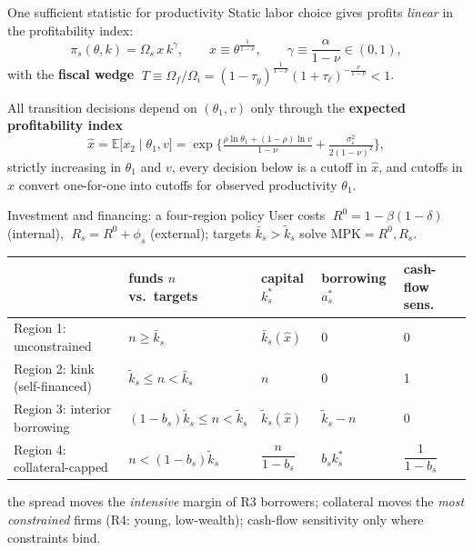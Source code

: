 \documentclass[11pt,aspectratio=169]{beamer}
\providecommand{\infml}{i}
\providecommand{\fml}{f}
\providecommand{\curv}{\gamma}
\providecommand{\prodx}{x}
\providecommand{\prodxhat}{\hat{x}}
\providecommand{\spread}[1]{\phi_{#1}}
\providecommand{\collat}[1]{b_{#1}}
\providecommand{\Rint}{R^{0}}
\providecommand{\Rext}[1]{R_{#1}}
\providecommand{\taxy}{\tau_{y}}
\providecommand{\taxl}{\tau_{\ell}}
\providecommand{\Om}[1]{\Omega_{#1}}
\providecommand{\netw}{n}
\providecommand{\E}{\mathbb{E}}
\begin{document}
\begin{frame}{One sufficient statistic for productivity}
Static labor choice gives profits \emph{linear} in the profitability
index:
\begin{equation*}
  \pi_{s}(\theta,k)=\Om{s}\,\prodx\,k^{\curv},\qquad
  \prodx\equiv\theta^{\frac{1}{1-\nu}},\qquad
  \curv\equiv\frac{\alpha}{1-\nu}\in(0,1),
\end{equation*}
with the \textbf{fiscal wedge}
$\;T\equiv\Om{\fml}/\Om{\infml}
=(1-\taxy)^{\frac{1}{1-\nu}}(1+\taxl)^{-\frac{\nu}{1-\nu}}<1$.
 
\bigskip
All transition decisions depend on $(\theta_{1},v)$ only through the
\textbf{expected profitability index}
\begin{equation*}
  \prodxhat=\E\big[\prodx_{2}\mid\theta_{1},v\big]
  =\exp\Big\{\tfrac{\rho\ln\theta_{1}+(1-\rho)\ln v}{1-\nu}
  +\tfrac{\sigma_{\varepsilon}^{2}}{2(1-\nu)^{2}}\Big\},
\end{equation*}
strictly increasing in $\theta_{1}$ and $v$, every decision below
is a cutoff in $\prodxhat$, and cutoffs in $\prodxhat$ convert
one-for-one into cutoffs for observed productivity $\theta_1$.
\end{frame}
 
\begin{frame}{Investment and financing: a four-region policy}
User costs $\;\Rint=1-\beta(1-\delta)$ (internal),
$\;\Rext{s}=\Rint+\spread{s}$ (external); targets
$\bar k_{s}>\tilde k_{s}$ solve $\mathrm{MPK}=\Rint,\Rext{s}$.
\begin{center}
\renewcommand{\arraystretch}{1.25}\small
\begin{tabular}{lllll}
\toprule
 & funds $\netw$ vs.\ targets & capital $k^{*}_{s}$ &
 borrowing $a^{*}_{s}$ & cash-flow sens.\ \\
\midrule
Region 1: unconstrained & $\netw\geq\bar k_{s}$ & $\bar k_{s}(\prodxhat)$
 & 0 & 0 \\
Region 2: kink (self-financed) & $\tilde k_{s}\leq\netw<\bar k_{s}$ &
 $\netw$ & 0 & 1 \\
Region 3: interior borrowing & $(1-\collat{s})\tilde k_{s}\leq\netw
 <\tilde k_{s}$ & $\tilde k_{s}(\prodxhat)$ & $\tilde k_{s}-\netw$
 & 0 \\
Region 4: collateral-capped & $\netw<(1-\collat{s})\tilde k_{s}$ &
 $\dfrac{\netw}{1-\collat{s}}$ & $\collat{s}k^{*}_{s}$ &
 $\dfrac{1}{1-\collat{s}}$ \\
\bottomrule
\end{tabular}
\end{center}
\medskip
{} the spread moves the \emph{intensive} margin of R3 borrowers; collateral moves the \emph{most constrained} firms (R4: young, low-wealth); cash-flow sensitivity only where constraints bind.

\end{frame}
 
\end{document}
